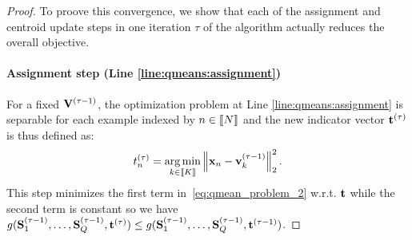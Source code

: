 \begin{proof}
To proove this convergence, we show that each of the assignment and centroid update steps in one iteration $\tau$ of the algorithm actually reduces the overall objective. 





\paragraph{Assignment step (Line \ref{line:qmeans:assignment})} For a fixed ${\mathbf{V}}^{(\tau-1)}$, the optimization problem at Line \ref{line:qmeans:assignment} is separable for each example indexed by $n \in \left \llbracket N\right \rrbracket$ and the new indicator vector ${\mathbf{t}}^{(\tau)}$ is thus defined as:
%
\begin{align}
\label{eq:qmean_problem_U_fixed}
 t^{(\tau)}_n = \operatorname*{arg\,min}_{k \in \left \llbracket K\right \rrbracket} \left \| {\mathbf{x}}_n - {\mathbf{v}}_k^{(\tau-1)}\right \|_2^2.
\end{align}
%
This step minimizes the first term in~\eqref{eq:qmean_problem_2} w.r.t. ${\mathbf{t}}$ while the second term is constant so we have $g({\mathbf{S}}_1^{(\tau-1)}, \ldots,{\mathbf{S}}_Q^{(\tau-1)}, {\mathbf{t}}^{(\tau)}) \leq g({\mathbf{S}}_1^{(\tau-1)}, \ldots,{\mathbf{S}}_Q^{(\tau-1)}, {\mathbf{t}}^{(\tau-1)})$.


\end{proof}
